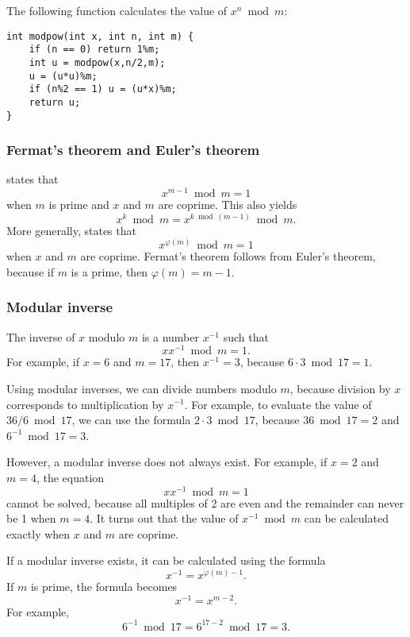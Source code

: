 The following function calculates the value of
$x^n \bmod m$:

\begin{lstlisting}
int modpow(int x, int n, int m) {
    if (n == 0) return 1%m;
    int u = modpow(x,n/2,m);
    u = (u*u)%m;
    if (n%2 == 1) u = (u*x)%m;
    return u;
}
\end{lstlisting}

\subsubsection{Fermat's theorem and Euler's theorem}


states that
\[x^{m-1} \bmod m = 1\]
when $m$ is prime and $x$ and $m$ are coprime.
This also yields
\[x^k \bmod m = x^{k \bmod (m-1)} \bmod m.\]
More generally, 
states that
\[x^{\varphi(m)} \bmod m = 1\]
when $x$ and $m$ are coprime.
Fermat's theorem follows from Euler's theorem,
because if $m$ is a prime, then $\varphi(m)=m-1$.

\subsubsection{Modular inverse}


The inverse of $x$ modulo $m$
is a number $x^{-1}$ such that
\[ x x^{-1} \bmod m = 1. \]
For example, if $x=6$ and $m=17$,
then $x^{-1}=3$, because $6\cdot3 \bmod 17=1$.

Using modular inverses, we can divide numbers
modulo $m$, because division by $x$
corresponds to multiplication by $x^{-1}$.
For example, to evaluate the value of $36/6 \bmod 17$,
we can use the formula $2 \cdot 3 \bmod 17$,
because $36 \bmod 17 = 2$ and $6^{-1} \bmod 17 = 3$.

However, a modular inverse does not always exist.
For example, if $x=2$ and $m=4$, the equation
\[ x x^{-1} \bmod m = 1 \]
cannot be solved, because all multiples of 2
are even and the remainder can never be 1 when $m=4$.
It turns out that the value of $x^{-1} \bmod m$
can be calculated exactly when $x$ and $m$ are coprime.

If a modular inverse exists, it can be
calculated using the formula
\[
x^{-1} = x^{\varphi(m)-1}.
\]
If $m$ is prime, the formula becomes
\[
x^{-1} = x^{m-2}.
\]
For example,
\[6^{-1} \bmod 17 =6^{17-2} \bmod 17 = 3.\]

